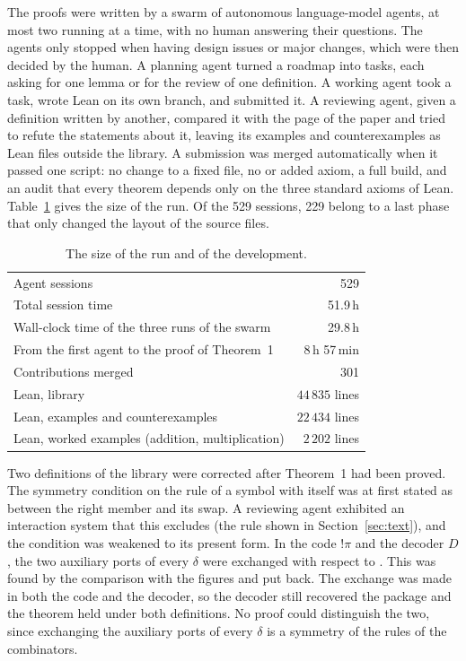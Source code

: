 \documentclass[11pt,a4paper]{article}
\newcommand{\Equiv}{\cod{Equiv}}
\newcommand{\pp}[1]{\cite[#1]{lafont1997}}
\begin{document}
The proofs were written by a swarm of autonomous language-model agents, at most two running at
a time, with no human answering their questions. The agents only stopped when having design issues or major changes, which were then decided by the human. A planning agent turned a roadmap into tasks,
each asking for one lemma or for the review of one definition. A working agent took a task,
wrote Lean on its own branch, and submitted it. A reviewing agent, given a definition written
by another, compared it with the page of the paper and tried to refute the statements about
it, leaving its examples and counterexamples as Lean files outside the library. A submission
was merged automatically when it passed one script: no change to a fixed file, no 
or added axiom, a full build, and an audit that every theorem depends only on the three
standard axioms of Lean. Table~\ref{tab:numbers} gives the size of the run. Of the 529
sessions, 229 belong to a last phase that only changed the layout of the source files.

\begin{table}[ht]
\centering\small
\begin{tabular}{@{}lr@{}}
\toprule
Agent sessions & 529 \\
Total session time & 51.9\,h \\
Wall-clock time of the three runs of the swarm & 29.8\,h \\
From the first agent to the proof of Theorem~1 & 8\,h 57\,min \\
Contributions merged & 301 \\
Lean, library & $44\,835$ lines \\
Lean, examples and counterexamples & $22\,434$ lines \\
Lean, worked examples (addition, multiplication) & $2\,202$ lines \\
\bottomrule
\end{tabular}
\caption{The size of the run and of the development.}
\label{tab:numbers}
\end{table}

Two definitions of the library were corrected after Theorem~1 had been proved. The symmetry condition on the
rule of a symbol with itself was at first stated as \Equiv{} between the right member and its
swap. A reviewing agent exhibited an interaction system that this excludes (the rule shown in
Section~\ref{sec:text}), and the condition was weakened to its present form. In the code
$!\pi$ and the decoder $D$, the two auxiliary ports of every $\delta$ were exchanged with
respect to \pp{Fig.~8}. This was found by the comparison with the figures and put back.
The exchange was made in both the code and the decoder, so the decoder still recovered the
package and the theorem held under both definitions. No proof could distinguish the two, since
exchanging the auxiliary ports of every $\delta$ is a symmetry of the rules of the combinators.
\end{document}
